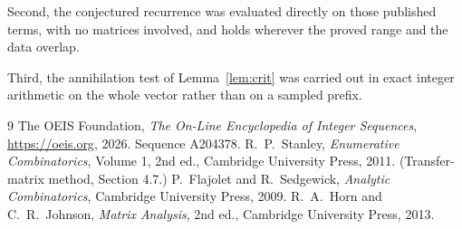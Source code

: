 \documentclass[11pt,a4paper]{article}
\theoremstyle{plain}
\theoremstyle{definition}
\begin{document}
Second, the conjectured recurrence was evaluated directly on those published terms, with no
matrices involved, and holds wherever the proved range and the data overlap.

Third, the annihilation test of Lemma~\ref{lem:crit} was carried out in exact integer
arithmetic on the whole vector rather than on a sampled prefix.

\begin{thebibliography}{9}
 The OEIS Foundation, \emph{The On-Line Encyclopedia of Integer
Sequences}, \url{https://oeis.org}, 2026. Sequence A204378.
 R.~P.~Stanley, \emph{Enumerative Combinatorics}, Volume 1, 2nd ed.,
Cambridge University Press, 2011. (Transfer-matrix method, Section 4.7.)
 P.~Flajolet and R.~Sedgewick, \emph{Analytic Combinatorics}, Cambridge
University Press, 2009.
 R.~A.~Horn and C.~R.~Johnson, \emph{Matrix Analysis}, 2nd ed., Cambridge
University Press, 2013.
\end{thebibliography}
\end{document}
